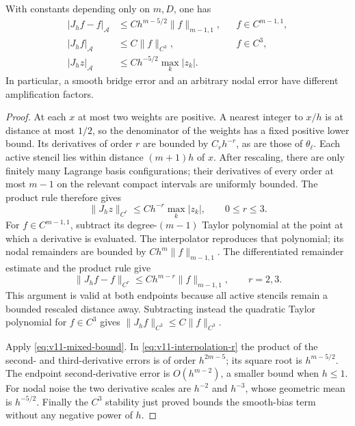 \begin{lemma}
\label{lem:v11-interpolation}
With constants depending only on $m,D$, one has
\begin{align}
 |J_hf-f|_{\mathscr A}
       &\le C h^{m-5/2}\|f\|_{m-1,1},
                    &&f\in C^{m-1,1},\label{eq:v11-approx}\\
 |J_hf|_{\mathscr A}
       &\le C\|f\|_{C^3},
                    &&f\in C^3,\label{eq:v11-smooth-bias}\\
 |J_hz|_{\mathscr A}
       &\le C h^{-5/2}\max_k|z_k|.
                                      \label{eq:v11-scalar-noise}
\end{align}
In particular, a smooth bridge error and an arbitrary nodal error
have different amplification factors.
\end{lemma}
\begin{proof}
At each $x$ at most two weights are positive. A nearest integer to
$x/h$ is at distance at most $1/2$, so the denominator of the weights
has a fixed positive lower bound. Its derivatives of order $r$ are
bounded by $C_rh^{-r}$, as are those of $\theta_\ell$. Each active
stencil lies within distance $(m+1)h$ of $x$. After rescaling, there
are only finitely many Lagrange basis configurations; their derivatives
of every order at most $m-1$ on the relevant compact intervals are
uniformly bounded. The product rule therefore gives
\[
 \|J_hz\|_{C^r}\le C h^{-r}\max_k|z_k|,\qquad 0\le r\le3.
\]
For $f\in C^{m-1,1}$, subtract its degree-$(m-1)$ Taylor polynomial
at the point at which a derivative is evaluated. The interpolator
reproduces that polynomial; its nodal remainders are bounded by
$C h^m\|f\|_{m-1,1}$. The differentiated remainder estimate and
the product rule give
\begin{equation}\label{eq:v11-interpolation-r}
 \|J_hf-f\|_{C^r}\le C h^{m-r}\|f\|_{m-1,1},\qquad r=2,3.
\end{equation}
This argument is valid at both endpoints because all active stencils
remain a bounded rescaled distance away. Subtracting instead the
quadratic Taylor polynomial for $f\in C^3$ gives
$\|J_hf\|_{C^3}\le C\|f\|_{C^3}$.

Apply \eqref{eq:v11-mixed-bound}. In \eqref{eq:v11-interpolation-r}
the product of the second- and third-derivative errors is of order
$h^{2m-5}$; its square root is $h^{m-5/2}$. The endpoint
second-derivative error is $O(h^{m-2})$, a smaller bound when
$h\le1$. For nodal noise the two derivative scales are $h^{-2}$
and $h^{-3}$, whose geometric mean is $h^{-5/2}$. Finally the
$C^3$ stability just proved bounds the smooth-bias term without any
negative power of $h$.
\end{proof}

